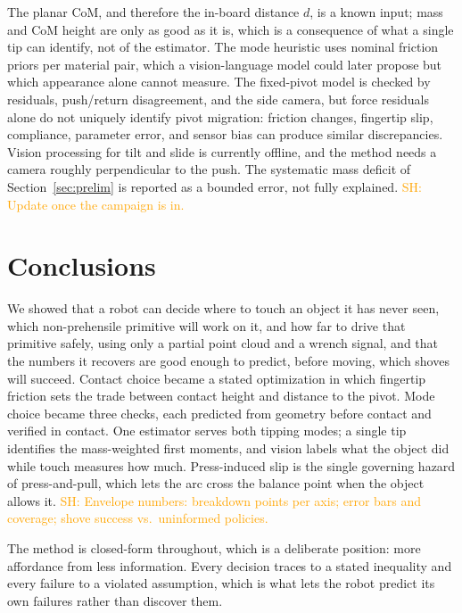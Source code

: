 \documentclass[10pt, conference]{IEEEtran}
\newcommand{\sh}[1]{\textcolor{orange}{SH: #1}}
\begin{document}
The planar CoM, and therefore the in-board distance $d$, is a known input; mass and CoM height are only as good as it is, which is a consequence of what a single tip can identify, not of the estimator. The mode heuristic uses nominal friction priors per material pair, which a vision-language model could later propose but which appearance alone cannot measure. The fixed-pivot model is checked by residuals, push/return disagreement, and the side camera, but force residuals alone do not uniquely identify pivot migration: friction changes, fingertip slip, compliance, parameter error, and sensor bias can produce similar discrepancies. Vision processing for tilt and slide is currently offline, and the method needs a camera roughly perpendicular to the push. The systematic mass deficit of Section~\ref{sec:prelim} is reported as a bounded error, not fully explained. \sh{Update once the campaign is in.}

\section{Conclusions} \label{sec:conclusion}

We showed that a robot can decide where to touch an object it has never seen, which non-prehensile primitive will work on it, and how far to drive that primitive safely, using only a partial point cloud and a wrench signal, and that the numbers it recovers are good enough to predict, before moving, which shoves will succeed. Contact choice became a stated optimization in which fingertip friction sets the trade between contact height and distance to the pivot. Mode choice became three checks, each predicted from geometry before contact and verified in contact. One estimator serves both tipping modes; a single tip identifies the mass-weighted first moments, and vision labels what the object did while touch measures how much. Press-induced slip is the single governing hazard of press-and-pull, which lets the arc cross the balance point when the object allows it. \sh{Envelope numbers: breakdown points per axis; error bars and coverage; shove success vs.\ uninformed policies.}

The method is closed-form throughout, which is a deliberate position: more affordance from less information. Every decision traces to a stated inequality and every failure to a violated assumption, which is what lets the robot predict its own failures rather than discover them.
\end{document}
